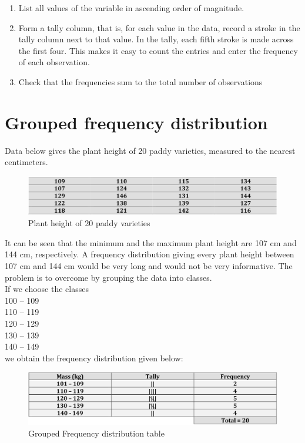 \documentclass[
]{book}
\begin{document}
\begin{enumerate}
\def\labelenumi{\arabic{enumi}.}
\item
  List all values of the variable in ascending order of magnitude.
\item
  Form a tally column, that is, for each value in the data, record a
  stroke in the tally column next to that value. In the tally, each
  fifth stroke is made across the first four. This makes it easy to
  count the entries and enter the frequency of each observation.
\item
  Check that the frequencies sum to the total number of observations
\end{enumerate}

\section{Grouped frequency distribution}\label{grouped-frequency-distribution}

Data below gives the plant height of 20 paddy varieties, measured to the
nearest centimeters.

\begin{figure}

{\centering \includegraphics[width=1\linewidth]{images/fig1.5} 

}

\caption{Plant height of 20 paddy varieties}\label{fig:figr}
\end{figure}

It can be seen that the minimum and the maximum plant height are 107 cm
and 144 cm, respectively. A frequency distribution giving every plant height between 107 cm and 144 cm would be very long and would not be very
informative. The problem is to overcome by grouping the data into
classes.\\
If we choose the classes\\
100 -- 109\\
110 -- 119\\
120 -- 129\\
130 -- 139\\
140 -- 149\\
we obtain the frequency distribution given below:

\begin{figure}

{\centering \includegraphics[width=1\linewidth]{images/fig1.6} 

}

\caption{Grouped Frequency distribution table}\label{fig:figs}
\end{figure}
\end{document}
